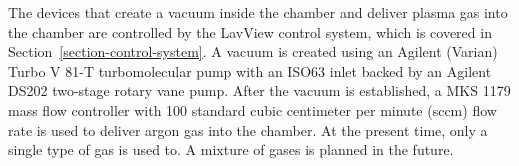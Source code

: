 The devices that create a vacuum inside the chamber and deliver plasma gas into the chamber are controlled by the LavView control system, which is covered in Section~\ref{section-control-system}. A vacuum is created using an Agilent (Varian) Turbo V 81-T turbomolecular pump with an ISO63 inlet backed by an Agilent DS202 two-stage rotary vane pump. After the vacuum is established, a MKS 1179 mass flow controller with 100 standard cubic centimeter per minute (sccm) flow rate is used to deliver argon gas into the chamber. At the present time, only a single type of gas is used to. A mixture of gases is planned in the future.





